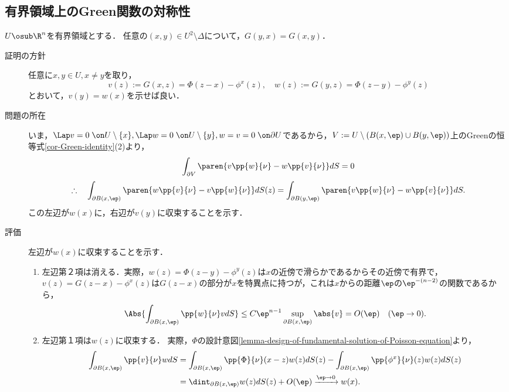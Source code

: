 \documentclass[uplatex,dvipdfmx]{jsreport}
\begin{document}
\subsection{有界領域上のGreen関数の対称性}

\begin{theorem}[Green関数は対称である]
    $U\osub\R^n$を有界領域とする．
    任意の$(x,y)\in U^2\setminus\Delta$について，$G(y,x)=G(x,y)$．
\end{theorem}
\begin{Proof}\mbox{}
    \begin{description}
        \item[証明の方針] 任意に$x,y\in U,x\ne y$を取り，
        \[v(z):=G(x,z)=\Phi(z-x)-\phi^x(z),\quad w(z):=G(y,z)=\Phi(z-y)-\phi^y(z)\]
        とおいて，$v(y)=w(x)$を示せば良い．
        \item[問題の所在] いま，$\Lap v=0\;\on U\setminus\{x\},\Lap w=0\;\on U\setminus\{y\},w=v=0\;\on\partial U$であるから，$V:=U\setminus(B(x,\ep)\cup B(y,\ep))$上のGreenの恒等式\ref{cor-Green-identity}(2)より，
        \[\int_{\partial V}\paren{v\pp{w}{\nu}-w\pp{v}{\nu}}dS=0\]
        \[\therefore\quad\int_{\partial B(x,\ep)}\paren{w\pp{v}{\nu}-v\pp{w}{\nu}}dS(z)=\int_{\partial B(y,\ep)}\paren{v\pp{w}{\nu}-w\pp{v}{\nu}}dS.\]
        この左辺が$w(x)$に，右辺が$v(y)$に収束することを示す．
        \item[評価] 左辺が$w(x)$に収束することを示す．
        \begin{enumerate}
            \item 左辺第２項は消える．実際，$w(z)=\Phi(z-y)-\phi^y(z)$は$x$の近傍で滑らかであるからその近傍で有界で，$v(z)=G(z-x)-\phi^x(z)$は$G(z-x)$の部分が$x$を特異点に持つが，これは$x$からの距離$\ep$の$\ep^{-(n-2)}$の関数であるから，
            \[\Abs{\int_{\partial B(x,\ep)}\pp{w}{\nu}vdS}\le C\ep^{n-1}\sup_{\partial B(x,\ep)}\abs{v}=O(\ep)\quad(\ep\to0).\]
            \item 左辺第１項は$w(z)$に収束する．
            実際，$\Phi$の設計意図\ref{lemma-design-of-fundamental-solution-of-Poisson-equation}より，
            \begin{align*}
                \int_{\partial B(x,\ep)}\pp{v}{\nu}wdS&=\int_{\partial B(x,\ep)}\pp{\Phi}{\nu}(x-z)w(z)dS(z)-\int_{\partial B(x,\ep)}\pp{\phi^x}{\nu}(z)w(z)dS(z)\\
                &=\dint_{\partial B(x,\ep)}w(z)dS(z)+O(\ep)\xrightarrow{\ep\to0}w(x).
            \end{align*}
        \end{enumerate}
    \end{description}
\end{Proof}
\end{document}
